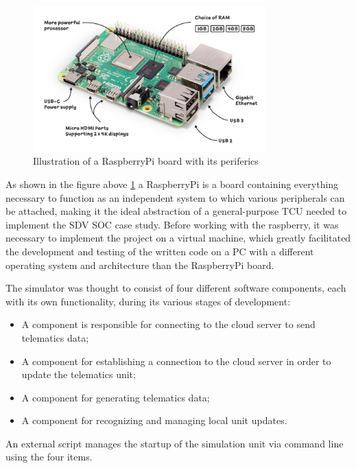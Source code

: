 \begin{figure}[h]  %
    \centering
    \includegraphics[width=0.8\textwidth]{images/raspberrypi.png}  %
    \caption{Illustration of a RaspberryPi board with its periferics \cite{raspberrypi}}
    \label{fig:raspberrypi}
\end{figure}

As shown in the figure above \ref{fig:raspberrypi} a RaspberryPi is a board containing everything necessary to function as an independent system to which various peripherals can be attached, making it the ideal abstraction of a general-purpose TCU needed to implement the SDV SOC case study.
Before working with the raspberry, it was necessary to implement the project on a virtual machine, which greatly facilitated the development and testing of the written code on a PC with a different operating system and architecture than the RaspberryPi board.

The simulator was thought to consist of four different software components, each with its own functionality, during its various stages of development:
\begin{itemize}
    \item A component is responsible for connecting to the cloud server to send telematics data;
    \item A component for establishing a connection to the cloud server in order to update the telematics unit;
    \item A component for generating telematics data;
    \item A component for recognizing and managing local unit updates.
\end{itemize}
An external script manages the startup of the simulation unit via command line using the four items. 

